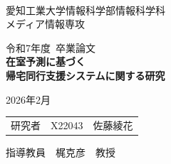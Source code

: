 \begin{titlepage}

  \ \\
  \begin{center}

    {\LARGE 愛知工業大学情報科学部情報科学科\\
      メディア情報専攻

      \vspace{1.0cm}

      令和7年度~卒業論文\\

      \vspace{2.0cm}
      {\Huge
        \baselineskip=15mm
        \textbf{在室予測に基づく\\
          帰宅同行支援システムに関する研究\\}
      }

      \vspace{7.0cm}

      2026年2月\\

      \vspace{1.0cm}

      \begin{tabular}[h]{lll}
        研究者 & X22043 & 佐藤綾花
      \end{tabular}

      \vspace{1.0cm}

      指導教員\ \ 梶克彦\ \ 教授}

  \end{center}

\end{titlepage}
